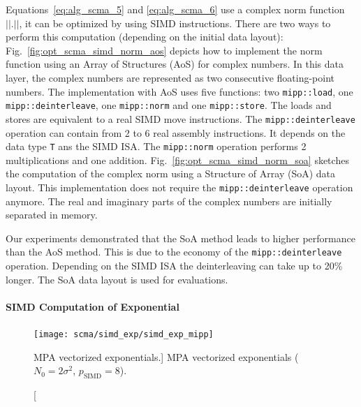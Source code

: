 
Equations~\eqref{eq:alg_scma_5} and \eqref{eq:alg_scma_6} use a complex norm
function $||.||$, it can be optimized by using SIMD instructions. There are two
ways to perform this computation (depending on the initial data layout):
Fig.~\ref{fig:opt_scma_simd_norm_aos} depicts how to implement the norm function
using an Array of Structures (AoS) for complex numbers. In this data layer, the
complex numbers are represented as two consecutive floating-point numbers. The
implementation with AoS uses five \MIPP functions: two \verb|mipp::load|, one
\verb|mipp::deinterleave|, one \verb|mipp::norm| and one \verb|mipp::store|.
The \MIPP loads and stores are equivalent to a real SIMD move instructions.
The \verb|mipp::deinterleave| operation can contain from 2 to 6 real assembly
instructions. It depends on the data type \verb|T| ans the SIMD ISA. The
\verb|mipp::norm| operation performs 2 multiplications and one addition.
Fig.~\ref{fig:opt_scma_simd_norm_soa} sketches the computation of the complex
norm using a Structure of Array (SoA) data layout. This implementation does
not require the \MIPP \verb|mipp::deinterleave| operation anymore. The real
and imaginary parts of the complex numbers are initially separated in memory.

Our experiments demonstrated that the SoA method leads to higher performance
than the AoS method. This is due to the economy of the \verb|mipp::deinterleave|
operation. Depending on the SIMD ISA the deinterleaving can take up to 20\%
longer. The SoA data layout is used for evaluations.

\paragraph{SIMD Computation of Exponential}

\begin{figure}[htp]
  \centering
  \texttt{[image: scma/simd\_exp/simd\_exp\_mipp]}
  \caption
    [MPA vectorized exponentials.]
    {MPA vectorized exponentials ($N_0 = 2\sigma^2$, $p_\text{SIMD} = 8$).}
  \label{fig:opt_scma_simd_exp}
\end{figure}


